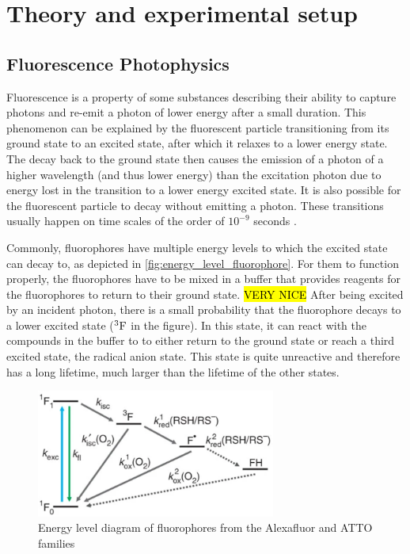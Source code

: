 \section{Theory and experimental setup}

\subsection{Fluorescence Photophysics} \label{sec:fluorescence_photophysics}
Fluorescence is a property of some substances describing their ability to capture photons and re-emit a photon of lower energy after a small duration. This phenomenon can be explained by the fluorescent particle transitioning from its ground state to an excited state, after which it relaxes to a lower energy state. The decay back to the ground state then causes the emission of a photon of a higher wavelength (and thus lower energy) than the excitation photon due to energy lost in the transition to a lower energy excited state. It is also possible for the fluorescent particle to decay without emitting a photon. These transitions usually happen on time scales of the order of $10^{-9}$ seconds \cite{douglass_notice_2023}.

Commonly, fluorophores have multiple energy levels to which the excited state can decay to, as depicted in \autoref{fig:energy_level_fluorophore}. For them to function properly, the fluorophores have to be mixed in a buffer that provides reagents for the fluorophores to return to their ground state. \hl{VERY NICE} After being excited by an incident photon, there is a small probability that the fluorophore decays to a lower excited state ($^3\textrm F$ in the figure). In this state, it can react with the compounds in the buffer to to either return to the ground state or reach a third excited state, the radical anion state. This state is quite unreactive and therefore has a long lifetime, much larger than the lifetime of the other states.
\begin{figure}[htbp]
    \centering
    \includegraphics[width=0.7\textwidth]{figures/alexafluor-jablonski-diagram.png}
    \caption{Energy level diagram of fluorophores from the Alexafluor and ATTO families \cite{vandelinde-natureprotocols-2011}}
    \label{fig:energy_level_fluorophore}
\end{figure}

